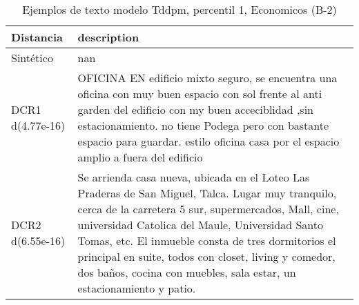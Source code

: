 \begin{table}[H]
\centering
\fontsize{10}{14}\selectfont
\caption{Ejemplos de texto modelo Tddpm, percentil 1, Economicos (B-2)}
\label{table-example-economicos-b-2-tddpm_mlp-1p-text}
\begin{tabular}{|l|m{35em}|}
\hline
\rowcolor[gray]{0.8}
Distancia & description \\
\hline Sintético & nan \\
\hline DCR1 d(4.77e-16) & OFICINA EN edificio mixto seguro, se encuentra una oficina con muy buen espacio con sol frente al anti garden del edificio con my buen acceciblidad  ,sin estacionamiento.  no tiene Podega pero con bastante espacio para guardar. estilo oficina casa por el espacio amplio a fuera del edificio \\
\hline DCR2 d(6.55e-16) & Se arrienda casa nueva, ubicada en el Loteo Las Praderas de San Miguel, Talca. Lugar muy tranquilo, cerca de la carretera 5 sur, supermercados, Mall, cine, universidad Catolica del Maule, Universidad Santo Tomas, etc. El inmueble consta de tres dormitorios el principal en suite, todos con closet, living y comedor, dos ba\~nos, cocina con muebles, sala estar, un estacionamiento y patio. \\
\hline
\end{tabular}
\end{table}
